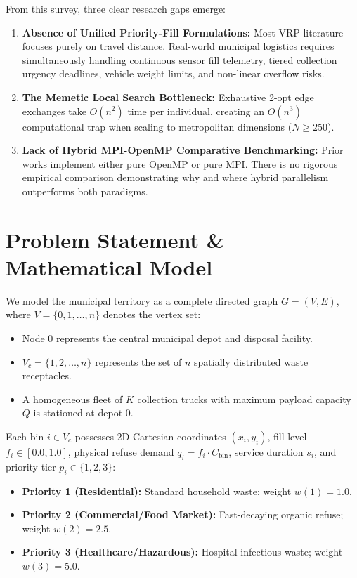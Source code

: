 \documentclass[conference]{IEEEtran}
\begin{document}
From this survey, three clear research gaps emerge:
\begin{enumerate}
    \item \textbf{Absence of Unified Priority-Fill Formulations:} Most VRP literature focuses purely on travel distance. Real-world municipal logistics requires simultaneously handling continuous sensor fill telemetry, tiered collection urgency deadlines, vehicle weight limits, and non-linear overflow risks.
    \item \textbf{The Memetic Local Search Bottleneck:} Exhaustive 2-opt edge exchanges take $O(n^2)$ time per individual, creating an $O(n^3)$ computational trap when scaling to metropolitan dimensions ($N \ge 250$).
    \item \textbf{Lack of Hybrid MPI-OpenMP Comparative Benchmarking:} Prior works implement either pure OpenMP or pure MPI. There is no rigorous empirical comparison demonstrating why and where hybrid parallelism outperforms both paradigms.
\end{enumerate}

\section{Problem Statement \& Mathematical Model}
We model the municipal territory as a complete directed graph $G = (V, E)$, where $V = \{0, 1, \dots, n\}$ denotes the vertex set:
\begin{itemize}
    \item Node $0$ represents the central municipal depot and disposal facility.
    \item $V_c = \{1, 2, \dots, n\}$ represents the set of $n$ spatially distributed waste receptacles.
    \item A homogeneous fleet of $K$ collection trucks with maximum payload capacity $Q$ is stationed at depot $0$.
\end{itemize}

Each bin $i \in V_c$ possesses 2D Cartesian coordinates $(x_i, y_i)$, fill level $f_i \in [0.0, 1.0]$, physical refuse demand $q_i = f_i \cdot C_{\text{bin}}$, service duration $s_i$, and priority tier $p_i \in \{1, 2, 3\}$:
\begin{itemize}
    \item \textbf{Priority 1 (Residential):} Standard household waste; weight $w(1) = 1.0$.
    \item \textbf{Priority 2 (Commercial/Food Market):} Fast-decaying organic refuse; weight $w(2) = 2.5$.
    \item \textbf{Priority 3 (Healthcare/Hazardous):} Hospital infectious waste; weight $w(3) = 5.0$.
\end{itemize}
\end{document}
